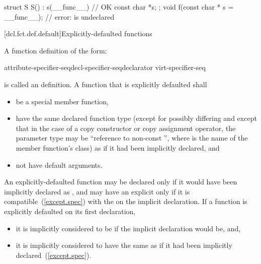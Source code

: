 \enterexample
\begin{codeblock}
struct S {
  S() : s(__func__) { }             // OK
  const char *s;
};
void f(const char * s = __func__);  // error:  is undeclared
\end{codeblock}
\exitexample

[dcl.fct.def.default]{Explicitly-defaulted functions}%

\pnum
A function definition of the form:

\begin{ncbnf}
    attribute-specifier-seq\opt decl-specifier-seq\opt declarator virt-specifier-seq\opt {}
\end{ncbnf}

is called an  definition.
A function that is explicitly defaulted shall

\begin{itemize}
\item be a special member function,

\item have the same declared function type (except for possibly differing
 and except that in the case of a copy constructor or
copy assignment operator, the parameter type may be ``reference to non-const '',
where  is the name of the member function's class) as if it had been implicitly
declared, and

\item not have default arguments.
\end{itemize}

\pnum
An explicitly-defaulted function may be declared
 only if it would have been implicitly declared as
,
and may have an explicit  only if it is
compatible~(\ref{except.spec}) with the 
on the implicit declaration. If
a function is explicitly defaulted on its first declaration,

\begin{itemize}
\item it is implicitly considered to be  if the implicit
declaration would be, and,
\item it is implicitly considered to have the same 
as if it had been implicitly declared~(\ref{except.spec}).
\end{itemize}

